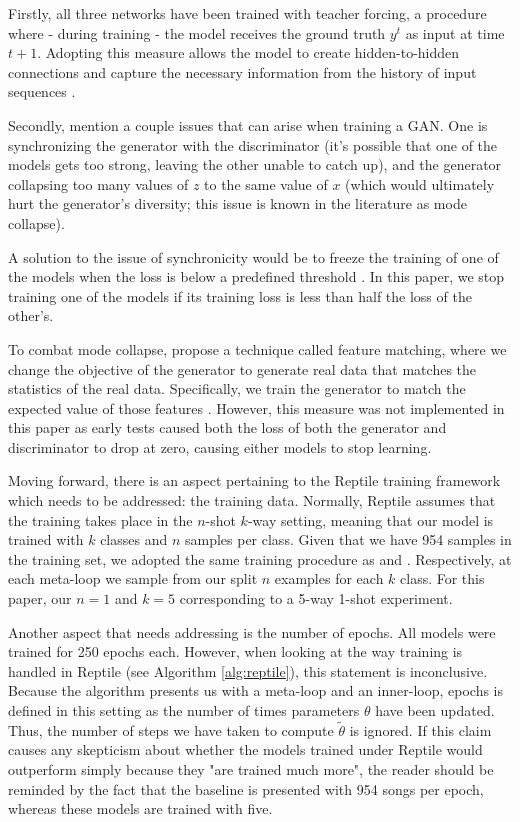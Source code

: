 \documentclass[a4paper]{book}
\begin{document}
Firstly, all three networks have been trained with teacher forcing, a procedure where - during training - the model receives the ground truth $y^t$ as input at time $t+1$. Adopting this measure allows the model to create hidden-to-hidden connections and capture the necessary information from the history of input sequences \parencite{goodfellow_deep_2016}.

Secondly, \textcite{goodfellow_generative_2014} mention a couple issues that can arise when training a GAN. One is synchronizing the generator with the discriminator (it's possible that one of the models gets too strong, leaving the other unable to catch up), and the generator collapsing too many values of $z$ to the same value of $x$ (which would ultimately hurt the generator's diversity; this issue is known in the literature as mode collapse).

A solution to the issue of synchronicity would be to freeze the training of one of the models when the loss is below a predefined threshold \parencite{mogren_c-rnn-gan_2016}. In this paper, we stop training one of the models if its training loss is less than half the loss of the other's.

To combat mode collapse, \textcite{salimans_improved_2016} propose a technique called feature matching, where we change the objective of the generator to generate real data that matches the statistics of the real data. Specifically, we train the generator to match the expected value of those features \parencite{salimans_improved_2016}. However, this measure was not implemented in this paper as early tests caused both the loss of both the generator and discriminator to drop at zero, causing either models to stop learning.

Moving forward, there is an aspect pertaining to the Reptile training framework which needs to be addressed: the training data. Normally, Reptile assumes that the training takes place in the $n$-shot $k$-way setting, meaning that our model is trained with $k$ classes and $n$ samples per class. Given that we have 954 samples in the training set, we adopted the same training procedure as \textcite{nichol_first-order_2018} and \textcite{clouatre_figr_2019}. Respectively, at each meta-loop we sample from our split $n$ examples for each $k$ class. For this paper, our $n=1$ and $k=5$ corresponding to a 5-way 1-shot experiment.

Another aspect that needs addressing is the number of epochs. All models were trained for 250 epochs each. However, when looking at the way training is handled in Reptile (see Algorithm \ref{alg:reptile}), this statement is inconclusive. Because the algorithm presents us with a meta-loop and an inner-loop, epochs is defined in this setting as the number of times parameters $\theta$ have been updated. Thus, the number of steps we have taken to compute $\tilde \theta$ is ignored. If this claim causes any skepticism about whether the models trained under Reptile would outperform simply because they "are trained much more", the reader should be reminded by the fact that the baseline is presented with 954 songs per epoch, whereas these models are trained with five.
\end{document}
